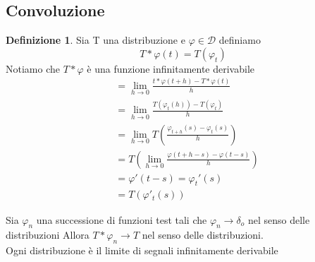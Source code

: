 \documentclass{article}
\theoremstyle{definition}
\newtheorem*{definizione}{Definizione}
\begin{document}
		\subsection{Convoluzione}
		\begin{definizione}
			Sia T una distribuzione e $\varphi \in \mathscr{D}$ definiamo 
			$$T * \varphi(t)=T(\varphi_t)$$
			Notiamo che $T*\varphi$ è una funzione infinitamente derivabile 
			\begin{align*}
			&=\lim_{h \rightarrow 0}\frac{t*\varphi(t+h)-T*\varphi(t)}{h}\\
			&=\lim_{h\rightarrow 0}\frac{T(\varphi_t(h))-T(\varphi_t)}{h}\\
			&=\lim_{h \rightarrow 0} T\left(\frac{\varphi_{t+h}(s)-\varphi_t(s)}{h}\right)\\
			&=T\left(\lim_{h \rightarrow 0} \frac{\varphi(t+h-s)-\varphi(t-s)}{h}\right)\\
			&=\varphi'(t-s)=\varphi_t'(s)\\
			&=T(\varphi'_t(s))
		\end{align*}
		\end{definizione}
	\begin{teo}{}{}
		Sia $\varphi_n$ una successione di funzioni test tali che $\varphi_n\rightarrow \delta_o$ nel senso delle distribuzioni Allora $T *\varphi_n \rightarrow T$ nel senso delle distribuzioni. \\
		Ogni distribuzione è il limite di segnali infinitamente derivabile 
	\end{teo}
\end{document}
